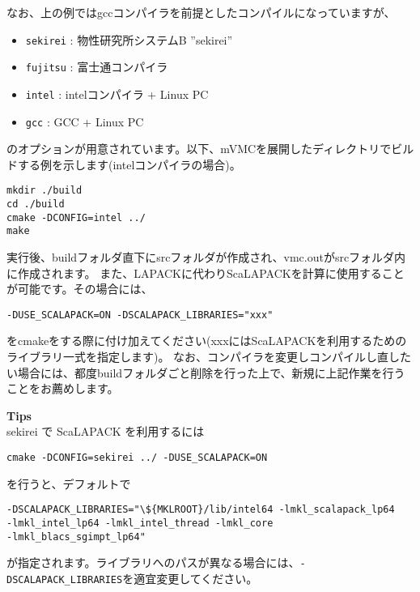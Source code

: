 なお、上の例ではgccコンパイラを前提としたコンパイルになっていますが、
\begin{itemize}
\item \verb|sekirei| : 物性研究所システムB ''sekirei''
\item \verb|fujitsu| : 富士通コンパイラ
\item \verb|intel| : intelコンパイラ + Linux PC
\item \verb|gcc| : GCC + Linux PC
\end{itemize}
のオプションが用意されています。以下、mVMCを展開したディレクトリでビルドする例を示します(intelコンパイラの場合)。
\begin{verbatim}
mkdir ./build
cd ./build
cmake -DCONFIG=intel ../
make
\end{verbatim}
実行後、buildフォルダ直下にsrcフォルダが作成され、vmc.outがsrcフォルダ内に作成されます。
また、LAPACKに代わりScaLAPACKを計算に使用することが可能です。その場合には、
\begin{verbatim}
-DUSE_SCALAPACK=ON -DSCALAPACK_LIBRARIES="xxx"
\end{verbatim}
をcmakeをする際に付け加えてください(xxxにはScaLAPACKを利用するためのライブラリ一式を指定します)。
なお、コンパイラを変更しコンパイルし直したい場合には、都度buildフォルダごと削除を行った上で、新規に上記作業を行うことをお薦めします。

\begin{screen}
\Large 
{\bf Tips}
\normalsize\\
sekirei で ScaLAPACK を利用するには
\begin{verbatim}
cmake -DCONFIG=sekirei ../ -DUSE_SCALAPACK=ON
\end{verbatim}
を行うと、デフォルトで
\begin{verbatim}
-DSCALAPACK_LIBRARIES="\${MKLROOT}/lib/intel64 -lmkl_scalapack_lp64 
-lmkl_intel_lp64 -lmkl_intel_thread -lmkl_core
-lmkl_blacs_sgimpt_lp64"
\end{verbatim}
が指定されます。ライブラリへのパスが異なる場合には、\verb$-DSCALAPACK_LIBRARIES$を適宜変更してください。
\end{screen}


